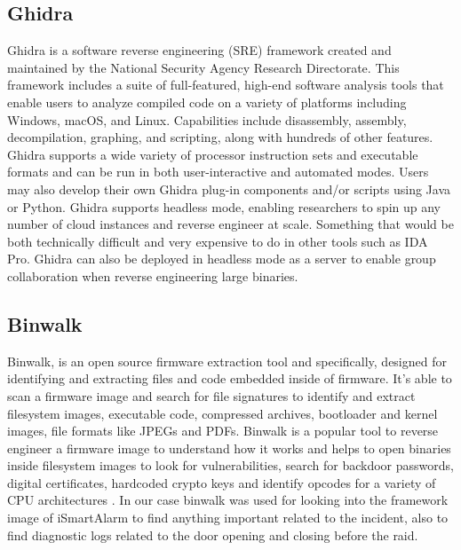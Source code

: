 \documentclass{easychair}
\begin{document}
\subsection{Ghidra}
Ghidra is a software reverse engineering (SRE) framework created and maintained by the National Security Agency Research Directorate. This framework includes a suite of full-featured, high-end software analysis tools that enable users to analyze compiled code on a variety of platforms including Windows, macOS, and Linux. Capabilities include disassembly, assembly, decompilation, graphing, and scripting, along with hundreds of other features. Ghidra supports a wide variety of processor instruction sets and executable formats and can be run in both user-interactive and automated modes. Users may also develop their own Ghidra plug-in components and/or scripts using Java or Python. \cite{Gh_3}
Ghidra supports headless mode, enabling researchers to spin up any number of cloud instances and reverse engineer at scale. Something that would be both technically difficult and very expensive to do in other tools such as IDA Pro. Ghidra can also be deployed in headless mode as a server to enable group collaboration when reverse engineering large binaries. \cite{Gh_4}\cite{Gh_5}

\subsection{Binwalk}
Binwalk, is an open source firmware extraction tool and specifically, designed for identifying and extracting files and code embedded inside of firmware. It’s able to scan a firmware image and search for file signatures to identify and extract filesystem images, executable code, compressed archives, bootloader and kernel images, file formats like JPEGs and PDFs\cite{Ab_1}\cite{Ab_2}. Binwalk is a popular tool to reverse engineer a firmware image to understand how it works and helps to open binaries inside filesystem images to look for vulnerabilities, search for backdoor passwords, digital certificates, hardcoded crypto keys and identify opcodes for a variety of CPU architectures \cite{Ab_3}. In our case binwalk was used for looking into the framework image of iSmartAlarm to find anything important related to the incident, also to find diagnostic  logs related to the door opening and closing before the raid.
\end{document}
